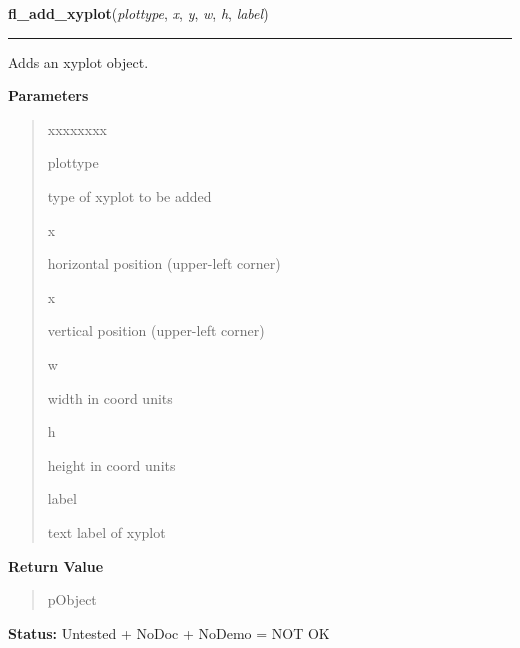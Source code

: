     \label{xformslib:library:fl_add_xyplot}

    \vspace{0.5ex}

\hspace{.8\funcindent}\begin{boxedminipage}{\funcwidth}

    \raggedright \textbf{fl\_add\_xyplot}(\textit{plottype}, \textit{x}, \textit{y}, \textit{w}, \textit{h}, \textit{label})

    \vspace{-1.5ex}

    \rule{\textwidth}{0.5\fboxrule}
\setlength{\parskip}{2ex}
    Adds an xyplot object.

\setlength{\parskip}{1ex}
      \textbf{Parameters}
      \vspace{-1ex}

      \begin{quote}
        \begin{Ventry}{xxxxxxxx}

          \item[plottype]

          type of xyplot to be added

          \item[x]

          horizontal position (upper-left corner)

          \item[x]

          vertical position (upper-left corner)

          \item[w]

          width in coord units

          \item[h]

          height in coord units

          \item[label]

          text label of xyplot

        \end{Ventry}

      \end{quote}

      \textbf{Return Value}
    \vspace{-1ex}

      \begin{quote}
      pObject

      \end{quote}

\textbf{Status:} Untested + NoDoc + NoDemo = NOT OK



    \end{boxedminipage}

